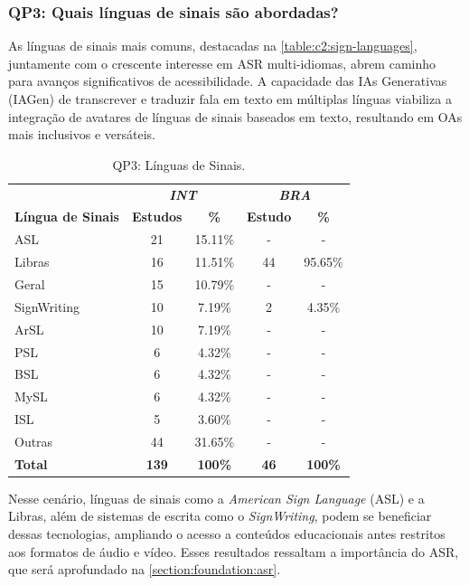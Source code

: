 \subsubsection{QP3: Quais línguas de sinais são abordadas?}


As línguas de sinais mais comuns, destacadas na \autoref{table:c2:sign-languages}, juntamente com o crescente interesse em ASR multi-idiomas, abrem caminho para avanços significativos de acessibilidade. A capacidade das IAs Generativas (IAGen) de transcrever e traduzir fala em texto em múltiplas línguas viabiliza a integração de avatares de línguas de sinais baseados em texto, resultando em OAs mais inclusivos e versáteis.

\begin{table}[htb]
\caption{QP3: Línguas de Sinais.}
\label{table:c2:sign-languages}
\centering
\begin{tabular}{l|cc|cc} \hline
 & \multicolumn{2}{c|}{\textit{\textbf{INT}}} & \multicolumn{2}{c}{\textit{\textbf{BRA}}} \\ \cline{2-5} 
\textbf{Língua de Sinais} & \textbf{Estudos} & \textbf{\%} & \textbf{Estudo} & \textbf{\%} \\ \hline
ASL & 21 & 15.11\% & - & - \\
Libras & 16 & 11.51\% & 44 & 95.65\% \\
Geral & 15 & 10.79\% & - & - \\
SignWriting & 10 & 7.19\% & 2 & 4.35\% \\
ArSL & 10 & 7.19\% & - & - \\
PSL & 6 & 4.32\% & - & - \\
BSL & 6 & 4.32\% & - & - \\
MySL & 6 & 4.32\% & - & - \\
ISL & 5 & 3.60\% & - & - \\
Outras & 44 & 31.65\% & - & - \\ \hline
\textbf{Total} & \textbf{139} & \textbf{100\%} & \textbf{46} & \textbf{100\%} \\ \hline
\end{tabular}
\end{table}

Nesse cenário, línguas de sinais como a \textit{American Sign Language} (ASL) e a Libras, além de sistemas de escrita como o \textit{SignWriting}, podem se beneficiar dessas tecnologias, ampliando o acesso a conteúdos educacionais antes restritos aos formatos de áudio e vídeo. Esses resultados ressaltam a importância do ASR, que será aprofundado na \autoref{section:foundation:asr}.

